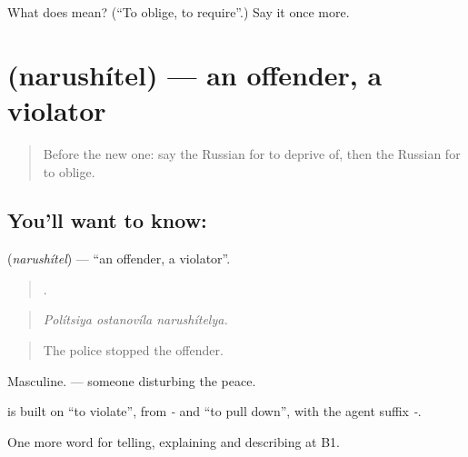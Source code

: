\begin{tcolorbox}[breakable,colback=teal!4,colframe=teal!35!black,title={Before you move on}]
What does  mean? (\textquotedblleft{}To oblige, to require\textquotedblright{}.) Say it once more.
\end{tcolorbox}
\section[\texorpdfstring{\ru{нарушитель} (narushítel)}{нарушитель (narushítel)}]{ (narushítel) — an offender, a violator}

\label{lesson:RU-C392-narushitel}



\begin{quote}
Before the new one: say the Russian for to deprive of, then the Russian for to oblige.
\end{quote}

\subsection*{You'll want to know: }
\textbf{} (\emph{narushítel}) — \textquotedblleft{}an offender, a violator\textquotedblright{}.

\begin{quote}
  .
\end{quote}

\begin{quote}
\emph{Polítsiya ostanovíla narushítelya.}
\end{quote}

\begin{quote}
The police stopped the offender.
\end{quote}

Masculine. \emph{ } — someone disturbing the peace.

\begin{cousinweb}
\textbf{} is built on \emph{} \textquotedblleft{}to violate\textquotedblright{}, from \emph{-} and \emph{} \textquotedblleft{}to pull down\textquotedblright{}, with the agent suffix \emph{-}.
\end{cousinweb}

\begin{grammarlens}[title={What you've built}]
One more word for telling, explaining and describing at B1.
\end{grammarlens}

